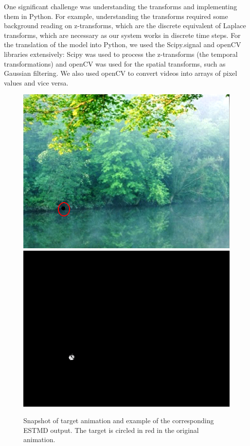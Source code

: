 \documentclass[a4paper,11pt]{article}
\begin{document}
	One significant challenge was understanding the transforms and implementing them in Python. For example, understanding the transforms required some background reading on z-transforms, which are the discrete equivalent of Laplace transforms, which are necessary as our system works in discrete time steps. For the translation of the model into Python, we used the Scipy.signal and openCV \cite{opencv} libraries extensively: Scipy was used to process the z-transforms (the temporal transformations) and openCV was used for the spatial transforms, such as Gaussian filtering. We also used openCV to convert videos into arrays of pixel values and vice versa.
\begin{figure}[H]
\includegraphics[scale = 0.4]{input}
\includegraphics[scale = 0.5]{processed}
\caption{Snapshot of target animation and example of the corresponding ESTMD output. The target is circled in red in the original animation.}
\end{figure}
\end{document}
